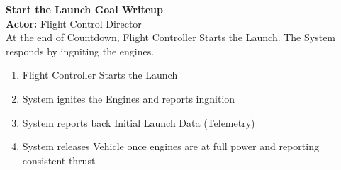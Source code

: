 \documentclass[letterpaper]{article}
\begin{document}
\noindent
\textbf{Start the Launch Goal Writeup}\\
\textbf{Actor:  }Flight Control Director\\
At the end of Countdown, Flight Controller Starts the Launch.  The
System responds by ingniting the engines.
\begin{enumerate}
\item Flight Controller Starts the Launch
\item System ignites the Engines and reports ingnition
\item System reports back Initial Launch Data (Telemetry)
\item System releases Vehicle once engines are at full power and
reporting consistent thrust
\end{enumerate}
\end{document}
